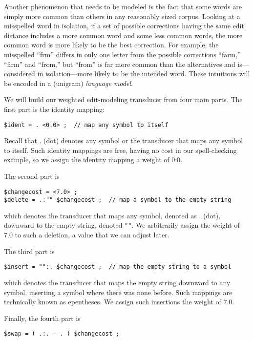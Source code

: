 Another phenomenon that needs to be modeled is the fact that some words are
simply more common than others in any reasonably sized corpus.  Looking at a misspelled word
in isolation,
if a set of possible corrections having the same edit distance includes a more common word and
	some less
common words, the more common word is more likely to be the best correction.  For
example, the misspelled ``frm'' differs in only one letter from the possible
corrections ``farm,'' ``firm'' and ``from,'' but ``from'' is far more common than
the alternatives and is---considered in isolation---more likely to be the intended
word.  These intuitions will be encoded in a (unigram) \emph{language model}.

We will build our weighted edit-modeling transducer from four main parts.  The first
part is the identity mapping:

\begin{Verbatim}
$ident = . <0.0> ;	// map any symbol to itself
\end{Verbatim}

\noindent
Recall that . (dot) denotes any symbol or the transducer that maps any
symbol to itself.  Such identity mappings are free, having no cost in
our spell-checking example, so we assign the identity mapping a weight of 0:0.

The second part is

\begin{Verbatim}
$changecost = <7.0> ;
$delete = .:"" $changecost ;  // map a symbol to the empty string
\end{Verbatim}

\noindent which denotes the transducer that maps any symbol, denoted as . (dot),
downward to the empty string, denoted \texttt{""}.  We arbitrarily assign the
weight of 7.0 to such a deletion, a value that we can adjust later.

The third part is

\begin{Verbatim}
$insert = "":. $changecost ;  // map the empty string to a symbol
\end{Verbatim}

\noindent which denotes the transducer that maps the empty string downward to any
symbol, inserting a symbol where there was none before.  Such mappings are technically known as
epentheses.  We assign such
insertions the weight of 7.0.

Finally, the fourth part is

\begin{Verbatim}
$swap = ( .:. - . ) $changecost ;
\end{Verbatim}

